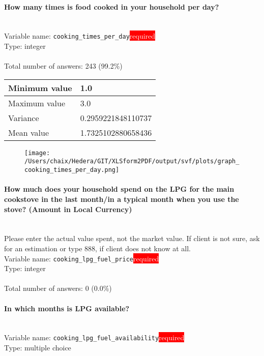 \documentclass[11.5pt, a4paper]{scrartcl}
\begin{document}
\paragraph{How many times is food cooked in your household per day?}
\  \\Variable name: \texttt{cooking\_times\_per\_day}\hfill\colorbox{red}{\small{\textcolor{white}{required}}}\\
 Type: integer\\
\\Total number of answers: 243 (99.2\%)
\\[0.2em] \begin{tabular}{p{4cm}|p{8cm}}
Minimum value &1.0 \\
\hline
\cellcolor{mygray} Maximum value & \cellcolor{mygray}3.0 \\
\hline
Variance &0.2959221848110737 \\
\hline
\cellcolor{mygray} Mean value & \cellcolor{mygray}1.7325102880658436 \\
\hline
\end{tabular}
\begin{figure}[H]
\centering
\texttt{[image: /Users/chaix/Hedera/GIT/XLSform2PDF/output/svf/plots/graph\_cooking\_times\_per\_day.png]}
\end{figure}
\paragraph{How much does your household spend on the LPG for the main cookstove in the last month/in a typical month when you use the stove? (Amount in Local Currency) }
\ \\ {\small Please enter the actual value spent, not the market value. If client is not sure, ask for an estimation or type 888, if client does not know at all. }
\  \\Variable name: \texttt{cooking\_lpg\_fuel\_price}\hfill\colorbox{red}{\small{\textcolor{white}{required}}}\\
 Type: integer\\
\\Total number of answers: 0 (0.0\%)
\\[0.2em]\paragraph{In which months is LPG available?}
\  \\Variable name: \texttt{cooking\_lpg\_fuel\_availability}\hfill\colorbox{red}{\small{\textcolor{white}{required}}}\\
 Type: multiple choice\\
\end{document}
